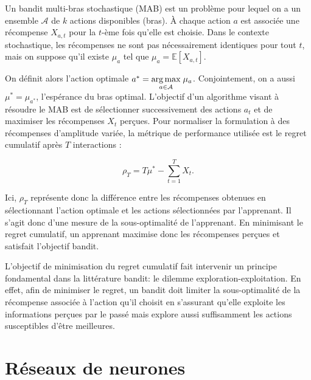 Un bandit multi-bras stochastique (MAB) est un problème pour lequel on a un ensemble
$\mathcal{A}$ de $k$ actions disponibles (bras).
À chaque action $a$ est associée une récompense $X_{a,t}$ pour la $t$-ème fois qu'elle
est choisie.
Dans le contexte stochastique, les récompenses ne sont pas nécessairement identiques pour tout $t$, mais on suppose
qu'il existe $\mu_a$ tel que $\mu_a = \mathbb{E} \left[X_{a,t} \right]$.

On définit alors l'action optimale $a^* = \underset{a \in \mathcal{A}}{\operatorname*{arg\,max}} \; \mu_a$.
Conjointement, on a aussi $\mu^* = \mu_{a^*}$, l'espérance du bras optimal.
L'objectif d'un algorithme visant à résoudre le MAB est de sélectionner
successivement des actions $a_t$ et de maximiser les récompenses $X_t$ perçues.
Pour normaliser la formulation à des récompenses d'amplitude variée, la métrique de performance
utilisée est le regret cumulatif après $T$ interactions :

\begin{equation}
    \rho_T = T \mu^* -  \sum_{t=1}^T  X_t.
    \label{eq:regret_cumulatif}
\end{equation}

Ici, $\rho_T$ représente donc la différence entre les récompenses obtenues en sélectionnant
l'action optimale et les actions sélectionnées par l'apprenant.
Il s'agit donc d'une mesure de la sous-optimalité de l'apprenant.
En minimisant le regret cumulatif, un apprenant maximise donc les récompenses perçues
et satisfait l'objectif bandit.

L'objectif de minimisation du regret cumulatif fait intervenir un principe fondamental
dans la littérature bandit: le dilemme exploration-exploitation.
En effet, afin de minimiser le regret, un bandit doit limiter la sous-optimalité de
la récompense associée à l'action qu'il choisit en s'assurant qu'elle exploite
les informations perçues par le passé mais explore aussi suffisamment les actions
susceptibles d'être meilleures.

\section{Réseaux de neurones}


